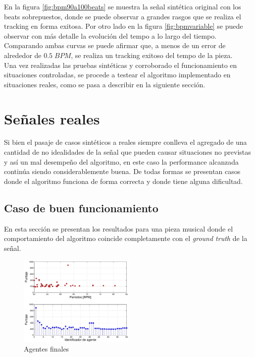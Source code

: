 \documentclass[12pt,a4paper,titlepage]{report}
\begin{document}
En la figura \ref{fig:bpm90a100beats} se muestra la señal sintética original con los beats sobrepuestos, donde se puede observar a grandes rasgos que se realiza el tracking en forma exitosa. Por otro lado en la figura \ref{fig:bpmvariable} se puede observar con más detalle la evolución del tempo a lo largo del tiempo. Comparando ambas curvas se puede afirmar que, a menos de un error de alrededor de $0.5\;BPM$, se realiza un tracking exitoso del tempo de la pieza.\\

Una vez realizadas las pruebas sintéticas y corroborado el funcionamiento en situaciones controladas, se procede a testear el algoritmo implementado en situaciones reales, como se pasa a describir en la siguiente sección.

\section{Señales reales}

Si bien el pasaje de casos sintéticos a reales siempre conlleva el agregado de una cantidad de no idealidades de la señal que pueden causar situaciones no previstas y así un mal desempeño del algoritmo, en este caso la performance alcanzada continúa siendo considerablemente buena. De todas formas se presentan casos donde el algoritmo funciona de forma correcta y donde tiene alguna dificultad.

\subsection{Caso de buen funcionamiento}

En esta sección se presentan los resultados para una pieza musical donde el comportamiento del algoritmo coincide completamente con el \emph{ground truth} de la señal.\\

\begin{figure}
	\vspace{-25pt}
	\begin{center}
	\includegraphics[width=0.5\textwidth]{./pics/datos_2_2_A_agents.pdf}
	\end{center}
	\vspace{-20pt}
	\caption{Agentes finales}
	\label{fig:datos_2_2_A_agents}
\end{figure}
\end{document}
